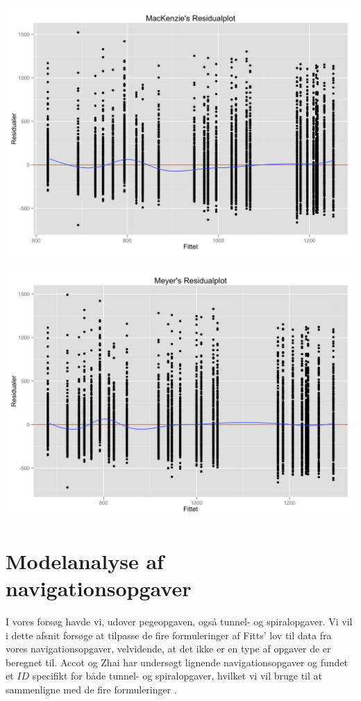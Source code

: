 \begin{minipage}{\linewidth}
\begin{minipage}{.5\linewidth}
		\label{fig:plot_residual_welford}
	\end{minipage}
	\begin{minipage}{.5\linewidth}
		\includegraphics[width=0.8\linewidth]{images/plots/plot_residual_mackenzie}
		\label{fig:plot_residual_mackenzie}
	\end{minipage}
	\begin{minipage}{.5\linewidth}
		\includegraphics[width=0.8\linewidth]{images/plots/plot_residual_meyer}
		\label{fig:plot_residual_meyer}
	\end{minipage}
\end{minipage}

\section*{Modelanalyse af navigationsopgaver}
I vores forsøg havde vi, udover pegeopgaven, også tunnel- og spiralopgaver. Vi vil i dette afsnit forsøge at tilpasse de fire formuleringer af Fitts' lov til data fra vores navigationsopgaver, velvidende, at det ikke er en type af opgaver de er beregnet til. Accot og Zhai har undersøgt lignende navigationsopgaver og fundet et $ID$ specifikt for både tunnel- og spiralopgaver, hvilket vi vil bruge til at sammenligne med de fire formuleringer \cite{accot1997}.

